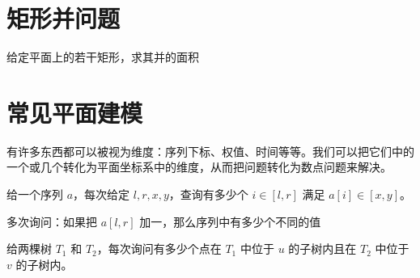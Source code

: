 \section{矩形并问题}

\begin{example}[矩形面积并]
    给定平面上的若干矩形，求其并的面积
\end{example}

\begin{exercise}
\end{exercise}

\begin{exercise}[矩形并的周长]
\end{exercise}



\section{常见平面建模}

有许多东西都可以被视为维度：序列下标、权值、时间等等。我们可以把它们中的一个或几个转化为平面坐标系中的维度，从而把问题转化为数点问题来解决。

\begin{example}[序列 $\times$ 值域]
    给一个序列 $a$，每次给定 $l,r,x,y$，查询有多少个 $i\in [l,r]$ 满足 $a[i] \in [x,y]$。
\end{example}

\begin{example}
    多次询问：如果把 $a[l,r]$ 加一，那么序列中有多少个不同的值
\end{example}

\begin{example}[序列 $\times$ 序列]
    给两棵树 $T_1$ 和 $T_2$，每次询问有多少个点在 $T_1$ 中位于 $u$ 的子树内且在 $T_2$ 中位于 $v$ 的子树内。
\end{example}

